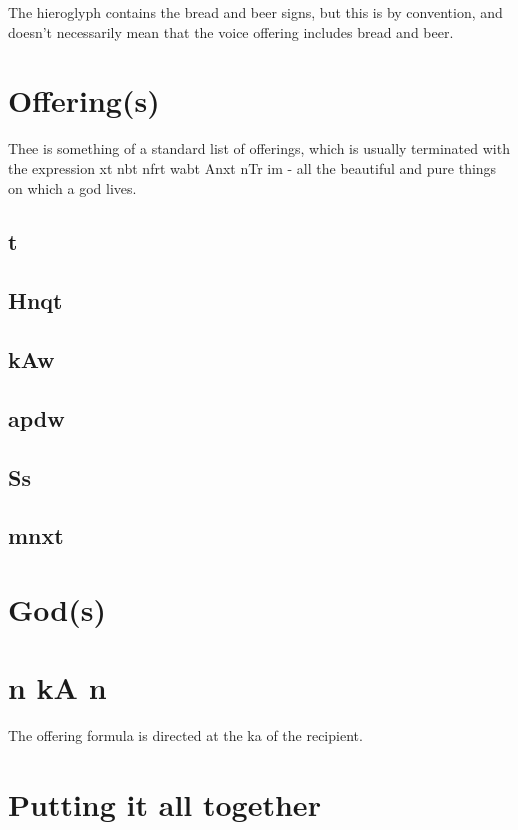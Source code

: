 The hieroglyph contains the bread and beer signs, but this is by convention, and doesn't necessarily mean that the voice offering includes bread and beer.

\section*{Offering(s)}

Thee is something of a standard list of offerings, which is usually terminated with the expression xt nbt nfrt wabt Anxt nTr im - all the beautiful and pure things on which a god lives.

\subsection*{t}

\subsection*{Hnqt}

\subsection*{kAw}

\subsection*{apdw}

\subsection*{Ss}

\subsection*{mnxt}

\section*{God(s)}

\section*{n kA n}

The offering formula is directed at the ka of the recipient.

\section*{Putting it all together}